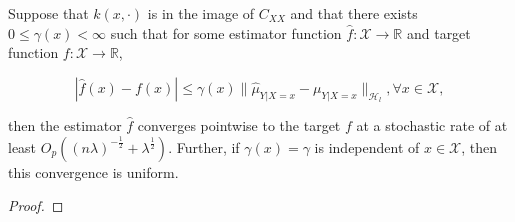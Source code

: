 \documentclass{llncs}
\numberwithin{equation}{section}
\numberwithin{table}{section}
\numberwithin{algorithm}{section}
\begin{document}
	\begin{theorem}
		\label{thm:pointwise_uniform_convergence}
		Suppose that $k(x, \cdot)$ is in the image of $C_{XX}$ and that there exists $0 \leq \gamma(x) < \infty$ such that for some estimator function $\hat{f} : \mathcal{X} \to \mathbb{R}$ and target function  $f : \mathcal{X} \to \mathbb{R}$,
		
		\begin{equation}
		| \hat{f}(x) - f(x) | \leq \gamma(x) \big\| \hat{\mu}_{Y | X = x} - \mu_{Y | X = x} \big\|_{\mathcal{H}_{l}}, \forall x \in \mathcal{X},
		\label{eq:estimator_error_bound}
		\end{equation}
		
		then the estimator $\hat{f}$ converges pointwise to the target $f$ at a stochastic rate of at least $O_{p}((n \lambda)^{-\frac{1}{2}} + \lambda^{\frac{1}{2}})$. Further, if $\gamma(x) = \gamma$ is independent of $x \in \mathcal{X}$, then this convergence is uniform.
		
		\begin{proof}
			

\end{proof}
\end{theorem}
\end{document}
